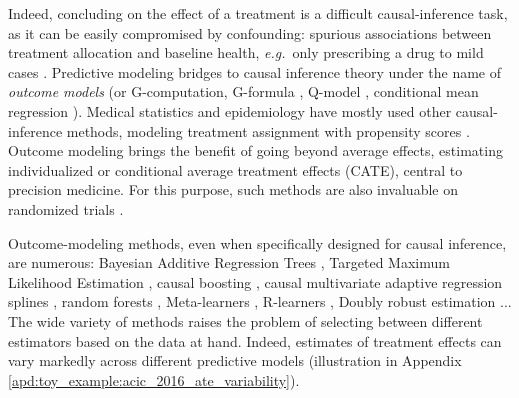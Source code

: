 \documentclass[11pt]{article}
\let\cite=\supercite
\newcommand{\eg}{\emph{e.g.}}
\begin{document}

Indeed, concluding on the effect of a treatment is a difficult
causal-inference task, as it can be easily compromised by confounding:
spurious associations between treatment
allocation and baseline health, \eg~only prescribing a drug to mild cases
\cite{hernan_causal_2020,vanderweele2019principles}.
Predictive modeling bridges to causal inference theory under the name of
\emph{outcome models} (or G-computation,
G-formula \cite{robins_role_1986}, Q-model
\cite{snowden_implementation_2011}, conditional mean regression
\cite{wendling_comparing_2018}).
Medical statistics and epidemiology have mostly used other
causal-inference methods, modeling treatment assignment
with propensity scores \cite{rosenbaum_central_1983,austin_moving_2015,casucci2018estimating,grose_use_2020}. Outcome modeling brings
the benefit of going
beyond average effects, estimating individualized or conditional average
treatment effects (CATE), central to precision medicine.
%
For this purpose, such methods are also invaluable on randomized trials
\cite{su2018random,lamont2018identification,hoogland2021tutorial}.


Outcome-modeling methods, even when specifically designed for causal
inference, are numerous: Bayesian Additive Regression Trees
\cite{hill_bayesian_2011}, Targeted Maximum Likelihood Estimation
\cite{laan_targeted_2011,schuler_targeted_2017}, causal boosting
\cite{powers_methods_2018}, causal multivariate adaptive regression
splines \cite{powers_methods_2018}, random forests
\cite{wager_estimation_2018, athey_generalized_2019},
Meta-learners \cite{kunzel_metalearners_2019}, R-learners
\cite{nie_quasioracle_2017}, Doubly robust estimation
\cite{chernozhukov_double_2018}...
The wide variety of methods raises the problem
of selecting between different estimators based on the data at hand. %
%
Indeed, estimates of treatment effects can vary markedly across different
predictive models \cite{fang2019applying,dorie_automated_2019} (illustration in
Appendix \ref{apd:toy_example:acic_2016_ate_variability}).
\end{document}
